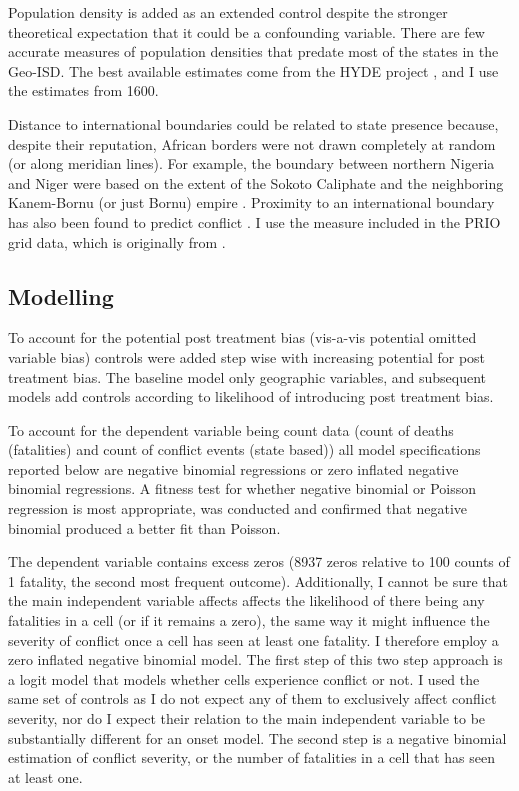 \documentclass[12pt]{article}
\begin{document}
Population density is added as an extended control despite the stronger
theoretical expectation that it could be a confounding variable. There
are few accurate measures of population densities that predate most of the
states in the Geo-ISD. The best available estimates come from the HYDE project
\citep{Goldewijk2016}, and I use the estimates from 1600.

Distance to international boundaries could be related to state presence because,
despite their reputation, African borders were not drawn completely at random
(or along meridian lines). For example, the boundary between northern Nigeria and
Niger were based on the extent of the Sokoto Caliphate and the neighboring
Kanem-Bornu (or just Bornu) empire \citep{HiribarrenVincent2017AHoB}. Proximity
to an international boundary has also been found to predict conflict
\citep{Buhaug2002}. I use the measure included in the PRIO grid data, which is
originally from \citet{Weidmann2010a}.


\subsection{Modelling} \label{Modelling}

To account for the potential post treatment bias (vis-a-vis potential omitted
variable bias) controls were added step wise with increasing potential for post
treatment bias. The baseline model only geographic variables, and subsequent
models add controls according to likelihood of introducing post treatment bias.

To account for the dependent variable being count data (count of deaths
(fatalities) and count of conflict events (state based)) all model
specifications reported below are negative binomial regressions or zero inflated
negative binomial regressions. A fitness test for whether negative binomial or
Poisson regression is most appropriate, was conducted and confirmed that
negative binomial produced a better fit than Poisson.

The dependent variable contains excess zeros (8937 zeros relative to 100 counts
of 1 fatality, the second most frequent outcome). Additionally, I cannot be
sure that the main independent variable affects affects the likelihood of there
being any fatalities in a cell (or if it remains a zero), the same way it might
influence the severity of conflict once a cell has seen at least one fatality. I
therefore employ a zero inflated negative binomial model. The first step of this
two step approach is a logit model that models whether cells experience conflict
or not. I used the same set of controls as I do not expect any of them to
exclusively affect conflict severity, nor do I expect their relation to the main
independent variable to be substantially different for an onset model. The
second step is a negative binomial estimation of conflict severity, or the
number of fatalities in a cell that has seen at least one.
\end{document}
